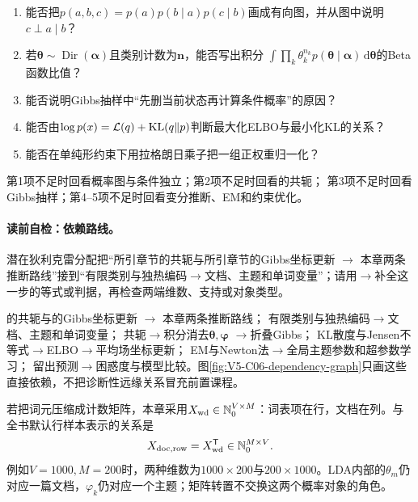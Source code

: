 \begin{precheckbox}
\begin{enumerate}[leftmargin=2.2em]
  \item 能否把$p(a,b,c)=p(a)p(b\mid a)p(c\mid b)$画成有向图，并从图中说明$c\perp a\mid b$？
  \item 若$\boldsymbol\theta\sim\operatorname{Dir}(\boldsymbol\alpha)$且类别计数为$\boldsymbol n$，能否写出积分
  $\int\prod_k\theta_k^{n_k}p(\boldsymbol\theta\mid\boldsymbol\alpha)\,\mathrm d\boldsymbol\theta$的Beta函数比值？
  \item 能否说明Gibbs抽样中“先删当前状态再计算条件概率”的原因？
  \item 能否由$\log p(x)=\mathcal L(q)+\operatorname{KL}(q\|p)$判断最大化ELBO与最小化KL的关系？
  \item 能否在单纯形约束下用拉格朗日乘子把一组正权重归一化？
\end{enumerate}
第1项不足时回看概率图与条件独立；第2项不足时回看的\DirichletMultinomial{}共轭；
第3项不足时回看Gibbs抽样；第4--5项不足时回看变分推断、EM和约束优化。
\end{precheckbox}

\label{struct:V5-C06-CH04}
\paragraph{读前自检：依赖路线。}潜在狄利克雷分配把“所引章节的\DirichletMultinomial{}共轭与所引章节的Gibbs坐标更新 $\to$ 本章两条推断路线”接到“有限类别与独热编码$\to$文档、主题和单词变量”；请用$\to$补全这一步的等式或判据，再检查两端维数、支持或对象类型。\par

\begin{dependencybox}
的\DirichletMultinomial{}共轭与的Gibbs坐标更新 $\to$ 本章两条推断路线；
有限类别与独热编码$\to$文档、主题和单词变量；
\DirichletMultinomial{}共轭$\to$积分消去$\boldsymbol\theta,\boldsymbol\varphi$
$\to$折叠Gibbs；
KL散度与Jensen不等式$\to$ELBO$\to$平均场坐标更新；
EM与Newton法$\to$全局主题参数和超参数学习；
留出预测$\to$困惑度与模型比较。图\ref{fig:V5-C06-dependency-graph}只画这些直接依赖，不把诊断性远缘关系冒充前置课程。
\end{dependencybox}


\begin{keypointbox}[title=数据方向桥：LDA语料仍按列放文档]
若把词元压缩成计数矩阵，本章采用$X_{\rm wd}\in\mathbb N_0^{V\times M}$：词表项在行，文档在列。与全书默认行样本表示的关系是
\[
X_{{\rm doc},{\rm row}}=X_{\rm wd}^{\mathsf T}
\in\mathbb N_0^{M\times V}.
\]
例如$V=1000,M=200$时，两种维数为$1000\times200$与$200\times1000$。LDA内部的$\theta_m$仍对应一篇文档，$\varphi_k$仍对应一个主题；矩阵转置不交换这两个概率对象的角色。
\end{keypointbox}

